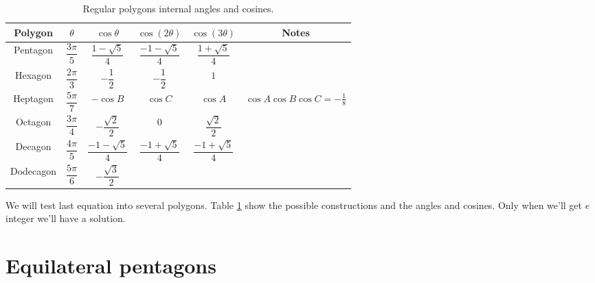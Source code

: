 \documentclass[11pt]{article}
\begin{document}
\begin{table}[h]
\centering
\begin{tabular}{|c c c c c c|}\hline
Polygon & $\theta$ & $\cos\theta$ & $\cos(2\theta)$ & $\cos(3\theta)$ & Notes 
 \rule[-2ex]{0pt}{6ex}\\ \hline\hline 
Pentagon & $\dfrac{3\pi}{5}$ &
 $\dfrac{1-\sqrt{5}}{4}$ & $\dfrac{-1-\sqrt{5}}{4}$ & $\dfrac{1+\sqrt{5}}{4}$ & 
 \rule[-2ex]{0pt}{6ex}\\ \hline
Hexagon & $\dfrac{2\pi}{3}$ &
 $-\dfrac{1}{2}$ & $-\dfrac{1}{2}$ & $1$ & 
 \rule[-2ex]{0pt}{6ex}\\ \hline
Heptagon & $\dfrac{5\pi}{7}$ &
 $-\cos{B}$ & $\cos{C}$ & $\cos{A}$ & $\cos{A}\cos{B}\cos{C} = -\frac{1}{8} $
 \rule[-2ex]{0pt}{6ex}\\ \hline
Octagon & $\dfrac{3\pi}{4}$ &
 $-\dfrac{\sqrt{2}}{2}$ & $0$ & $\dfrac{\sqrt{2}}{2}$ & 
 \rule[-2ex]{0pt}{6ex}\\ \hline
Decagon & $\dfrac{4\pi}{5}$ &
 $\dfrac{-1-\sqrt{5}}{4}$ & $\dfrac{-1+\sqrt{5}}{4}$ & $\dfrac{-1+\sqrt{5}}{4}$ &
 \rule[-2ex]{0pt}{6ex}\\ \hline
Dodecagon & $\dfrac{5\pi}{6}$ &
 $-\dfrac{\sqrt{3}}{2}$ &  &  &
 \rule[-2ex]{0pt}{6ex}\\ \hline

\end{tabular}
\caption{Regular polygons internal angles and cosines.}
\label{tbl:polygons}
\end{table}

We will test last equation into several polygons. Table \ref{tbl:polygons}
show the possible constructions and the angles and cosines.
Only when we'll get $e$ integer we'll have a solution.

\section{Equilateral pentagons}
\end{document}
